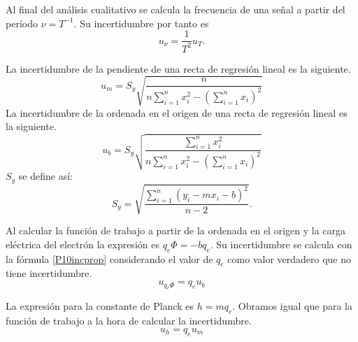 \documentclass[12pt]{article}
\numberwithin{table}{section}
\numberwithin{figure}{section}
\numberwithin{equation}{section}
\begin{document}
Al final del análisis cualitativo se calcula la frecuencia de una señal a partir del período $\nu=T^{-1}$. Su incertidumbre por tanto es
\begin{equation}\label{P10incfreq}
u_\nu=\frac{1}{T^2}u_T.
\end{equation}

La incertidumbre de la pendiente de una recta de regresión lineal es la siguiente.
\begin{equation}\label{P10incpend}
u_m=S_y\sqrt{\frac{n}{\displaystyle{n\sum_{i=1}^nx_i^2-\left(\sum_{i=1}^nx_i\right)^2}}}
\end{equation}
La incertidumbre de la ordenada en el origen de una recta de regresión lineal es la siguiente.
\begin{equation}\label{P10incord}
u_b=S_y\sqrt{\frac{\displaystyle{\sum_{i=1}^nx_i^2}}{\displaystyle{n\sum_{i=1}^nx_i^2-\left(\sum_{i=1}^nx_i\right)^2}}}
\end{equation}
$S_y$ se define así:
\begin{equation}\label{P10incy}
S_y=\sqrt{\frac{\displaystyle{\sum_{i=1}^n(y_i-mx_i-b)^2}}{n-2}}.
\end{equation}

Al calcular la función de trabajo a partir de la ordenada en el origen y la carga eléctrica del electrón la expresión es $q_e\Phi=-bq_e$. Su incertidumbre se calcula con la fórmula \ref{P10incprop} considerando el valor de $q_e$ como valor verdadero que no tiene incertidumbre.
\begin{equation}\label{P10inctrabajo}
u_{q_e\Phi}=q_eu_b
\end{equation}

La expresión para la constante de Planck es $h=mq_e$. Obramos igual que para la función de trabajo a la hora de calcular la incertidumbre.
\begin{equation}\label{P10incPlanck}
u_h=q_eu_m
\end{equation}
\end{document}
